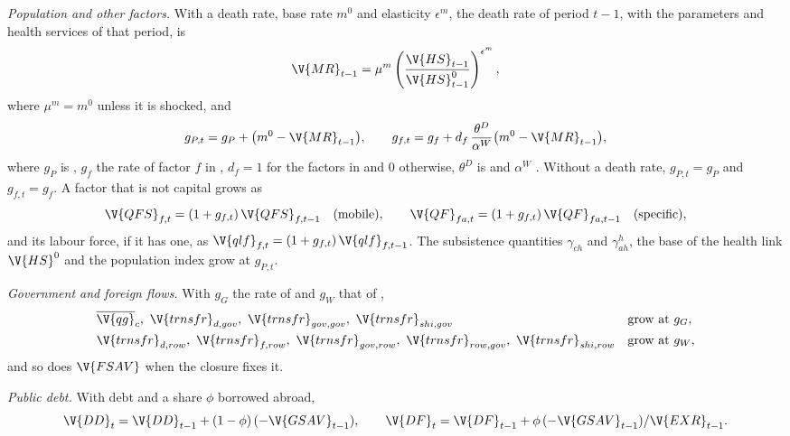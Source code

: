 \textit{Population and other factors.} With a death rate, base rate $m^0$ and
elasticity $\epsilon^m$, the death rate of period $t-1$, with the parameters
and health services of that period, is
\begin{equation*}
\V{MR}_{t-1} = \mu^m \left(\frac{\V{HS}_{t-1}}{\V{HS}^0_{t-1}}\right)^{\epsilon^m},
\end{equation*}
where $\mu^m = m^0$ unless it is shocked, and
\begin{equation*}
g_{P,t} = g_P + \bigl(m^0 - \V{MR}_{t-1}\bigr), \qquad
g_{f,t} = g_f + d_f\,\frac{\theta^D}{\alpha^W}\bigl(m^0 - \V{MR}_{t-1}\bigr),
\end{equation*}
where $g_P$ is , $g_f$ the rate of factor $f$ in
, $d_f = 1$ for the factors in  and 0
otherwise, $\theta^D$ is  and $\alpha^W$ .
Without a death rate, $g_{P,t} = g_P$ and $g_{f,t} = g_f$. A factor that is
not capital grows as
\begin{equation*}
\V{QFS}_{f,t} = (1 + g_{f,t})\,\V{QFS}_{f,t-1} \quad\text{(mobile)}, \qquad
\V{QF}_{fa,t} = (1 + g_{f,t})\,\V{QF}_{fa,t-1} \quad\text{(specific)},
\end{equation*}
and its labour force, if it has one, as $\V{qlf}_{f,t} = (1+g_{f,t})\,\V{qlf}_{f,t-1}$.
The subsistence quantities $\gamma_{ch}$ and $\gamma^h_{ah}$, the base of the
health link $\V{HS}^0$ and the population index grow at $g_{P,t}$.

\textit{Government and foreign flows.} With $g_G$ the rate of
 and $g_W$ that of ,
\begin{align*}
&\overline{\V{qg}}_c,\ \V{trnsfr}_{d,gov},\ \V{trnsfr}_{gov,gov},\ \V{trnsfr}_{shi,gov}
  && \text{grow at } g_G,\\
&\V{trnsfr}_{d,row},\ \V{trnsfr}_{f,row},\ \V{trnsfr}_{gov,row},\ \V{trnsfr}_{row,gov},\
  \V{trnsfr}_{shi,row} && \text{grow at } g_W,
\end{align*}
and so does $\V{FSAV}$ when the closure fixes it.

\textit{Public debt.} With debt and a share $\phi$ borrowed abroad,
\begin{equation*}
\V{DD}_t = \V{DD}_{t-1} + (1-\phi)\,(-\V{GSAV}_{t-1}), \qquad
\V{DF}_t = \V{DF}_{t-1} + \phi\,(-\V{GSAV}_{t-1})/\V{EXR}_{t-1} .
\end{equation*}

